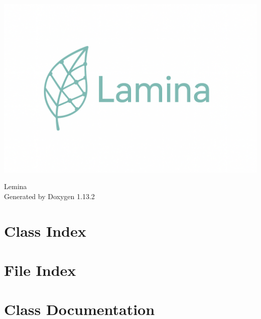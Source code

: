 \documentclass[twoside]{book}
\newcommand{\+}{\discretionary{\mbox{\scriptsize$\hookleftarrow$}}{}{}}
\newcommand{\clearemptydoublepage}{%
    \newpage{\pagestyle{empty}\cleardoublepage}%
  }
\begin{document}
  \raggedbottom
    \hypersetup{pageanchor=false,
                bookmarksnumbered=true,
                pdfencoding=unicode
               }
  \begin{titlepage}
 \begin{center}
    \includegraphics[width=\textwidth]{../../figures/LogoLaminaLatex.png} \\[1cm]
  \end{center}
  \vspace*{7cm}
  \begin{center}%
  {\Large Lemina}\\
  \vspace*{1cm}
  {\large Generated by Doxygen 1.13.2}\\
  \end{center}
  \end{titlepage}
  \clearemptydoublepage
  \tableofcontents
  \clearemptydoublepage
  \hypersetup{pageanchor=true}

\chapter{Class Index}

\chapter{File Index}

\chapter{Class Documentation}

\end{document}
